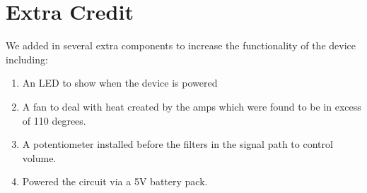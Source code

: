 \documentclass{article}
\begin{document}
\section*{Extra Credit}
We added in several extra components to increase the functionality of the 
device including:
\begin{enumerate}
\item An LED to show when the device is powered
\item A fan to deal with heat created by the amps which were found to be in
 excess of 110 degrees.
\item A potentiometer installed before the filters in the signal path to 
control volume.
\item Powered the circuit via a 5V battery pack.
\end{enumerate}
\end{document}
